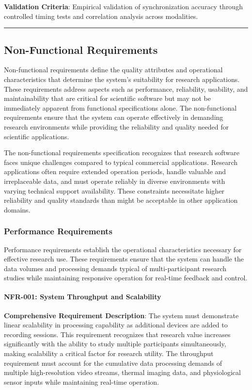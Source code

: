 \documentclass[11pt,a4paper]{report}
\begin{document}
\textbf{Validation Criteria}: Empirical validation of synchronization accuracy through controlled timing tests and
correlation analysis across modalities.

\hrule

\subsection{Non-Functional Requirements}

Non-functional requirements define the quality attributes and operational characteristics that determine the system's
suitability for research applications. These requirements address aspects such as performance, reliability, usability,
and maintainability that are critical for scientific software but may not be immediately apparent from functional
specifications alone. The non-functional requirements ensure that the system can operate effectively in demanding
research environments while providing the reliability and quality needed for scientific applications.

The non-functional requirements specification recognizes that research software faces unique challenges compared to
typical commercial applications. Research applications often require extended operation periods, handle valuable and
irreplaceable data, and must operate reliably in diverse environments with varying technical support availability. These
constraints necessitate higher reliability and quality standards than might be acceptable in other application domains.

\subsubsection{Performance Requirements}

Performance requirements establish the operational characteristics necessary for effective research use. These
requirements ensure that the system can handle the data volumes and processing demands typical of multi-participant
research studies while maintaining responsive operation for real-time feedback and control.

\paragraph{NFR-001: System Throughput and Scalability}

\textbf{Comprehensive Requirement Description}: The system must demonstrate linear scalability in processing capability as
additional devices are added to recording sessions. This requirement recognizes that research value increases
significantly with the ability to study multiple participants simultaneously, making scalability a critical factor for
research utility. The throughput requirement must account for the cumulative data processing demands of multiple
high-resolution video streams, thermal imaging data, and physiological sensor inputs while maintaining real-time
operation.
\end{document}

